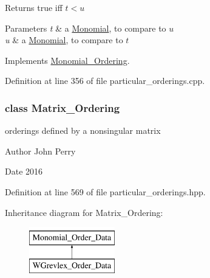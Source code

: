 \begin{DoxyReturn}{Returns}
{\ttfamily true} iff $t< u$ 
\end{DoxyReturn}

\begin{DoxyParams}{Parameters}
{\em t} & a \hyperlink{group__polygroup_class_monomial}{Monomial}, to compare to $ u $ \\
\hline
{\em u} & a \hyperlink{group__polygroup_class_monomial}{Monomial}, to compare to $ t $ \\
\hline
\end{DoxyParams}


Implements \hyperlink{group__orderinggroup_ab6c02638f87382f7a9a95b994e9a5dfb}{Monomial\+\_\+\+Ordering}.



Definition at line 356 of file particular\+\_\+orderings.\+cpp.

\label{class_matrix___ordering}
\subsubsection{class Matrix\+\_\+\+Ordering}
orderings defined by a nonsingular matrix 

\begin{DoxyAuthor}{Author}
John Perry 
\end{DoxyAuthor}
\begin{DoxyDate}{Date}
2016 
\end{DoxyDate}


Definition at line 569 of file particular\+\_\+orderings.\+hpp.

Inheritance diagram for Matrix\+\_\+\+Ordering\+:\begin{figure}[H]
\begin{center}
\leavevmode
\includegraphics[height=2.000000cm]{group__orderinggroup}
\end{center}
\end{figure}
